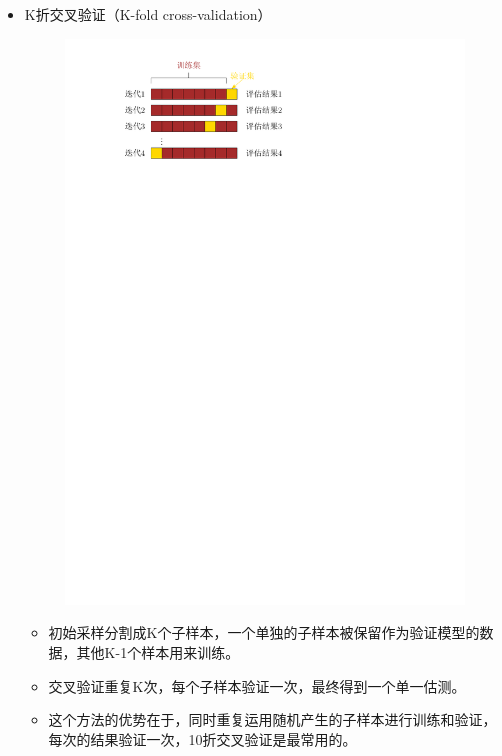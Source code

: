 \begin{itemize}
\begin{note}
\begin{itemize}
        \end{itemize}
    \end{note}
    \item K折交叉验证（K-fold cross-validation）
    \begin{figure}[htbp]
        \centering
        \includegraphics{image/K折交叉验证.pdf}
    \end{figure}
    \begin{itemize}
        \item 初始采样分割成K个子样本，一个单独的子样本被保留作为验证模型的数据，其他K-1个样本用来训练。
        \item 交叉验证重复K次，每个子样本验证一次，最终得到一个单一估测。
        \item 这个方法的优势在于，同时重复运用随机产生的子样本进行训练和验证，每次的结果验证一次，10折交叉验证是最常用的。
    \end{itemize}
\end{itemize}

